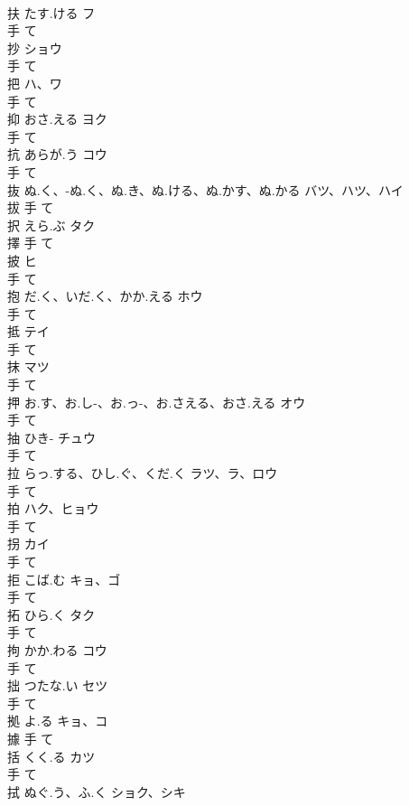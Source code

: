 \documentclass[8pt]{extreport}
\begin{document}
\begin{CJK}{UTF8}{min}
\\	扶	たす.ける	フ	
\\	手		て		
\\	抄		ショウ	
\\	手		て		
\\	把		ハ、ワ	
\\	手		て		
\\	抑	おさ.える	ヨク	
\\	手		て		
\\	抗	あらが.う	コウ	
\\	手		て		
\\	抜	ぬ.く、-ぬ.く、ぬ.き、ぬ.ける、ぬ.かす、ぬ.かる	バツ、ハツ、ハイ	
\\	拔	手		て		
\\	択	えら.ぶ	タク	
\\	擇	手		て		
\\	披		ヒ	
\\	手		て		
\\	抱	だ.く、いだ.く、かか.える	ホウ	
\\	手		て		
\\	抵		テイ	
\\	手		て		
\\	抹		マツ	
\\	手		て		
\\	押	お.す、お.し-、お.っ-、お.さえる、おさ.える	オウ	
\\	手		て		
\\	抽	ひき-	チュウ	
\\	手		て		
\\	拉	らっ.する、ひし.ぐ、くだ.く	ラツ、ラ、ロウ	
\\	手		て		
\\	拍		ハク、ヒョウ	
\\	手		て		
\\	拐		カイ	
\\	手		て		
\\	拒	こば.む	キョ、ゴ	
\\	手		て		
\\	拓	ひら.く	タク	
\\	手		て		
\\	拘	かか.わる	コウ	
\\	手		て		
\\	拙	つたな.い	セツ	
\\	手		て		
\\	拠	よ.る	キョ、コ	
\\	據	手		て		
\\	括	くく.る	カツ	
\\	手		て		
\\	拭	ぬぐ.う、ふ.く	ショク、シキ	

\end{CJK}
\end{document}
